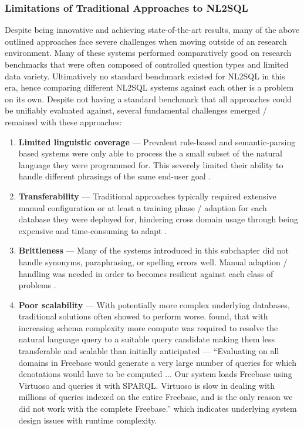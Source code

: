 \documentclass{article}
\begin{document}
\subsubsection{Limitations of Traditional Approaches to NL2SQL}

Despite being innovative and achieving state-of-the-art results, many of the above outlined approaches face severe 
challenges when moving outside of an research environment. Many of these systems performed comparatively good on research
benchmarks that were often composed of controlled question types and limited data variety. Ultimatively no standard
benchmark existed for NL2SQL in this era, hence comparing different NL2SQL systems against each other is a problem on 
its own. Despite not having a standard benchmark that all approaches could be unifiably evaluated against, several 
fundamental challenges emerged / remained with these approaches:

\begin{enumerate}
    \item \textbf{Limited linguistic coverage} — Prevalent rule-based and semantic-parsing based systems were only able to 
          process the a small subset of the natural language they were programmed for. This severely limited their 
          ability to handle different phrasings of the same end-user goal \citep{StringKernels, UnnaturalQueryLanguage, 
          Lunar, Ladder}.
    \item \textbf{Transferability} — Traditional approaches typically required extensive manual configuration or at least
          a training phase / adaption for each database they were deployed for, hindering cross domain usage through being 
          expensive and time-consuming to adapt \citep{NLIDBs, Lunar}.
    \item \textbf{Brittleness} — Many of the systems introduced in this subchapter did not handle synonyms, paraphrasing,   
          or spelling errors well. Manual adaption / handling was needed in order to becomes resilient against each class
          of problems \citep{StringKernels, SQLizer}.
    \item \textbf{Poor scalability} — With potentially more complex underlying databases, traditional 
          solutions often showed to perform worse. \citeauthor*{GraphMatching} found, that with increasing schema
          complexity more compute was required to resolve the natural language query to a suitable query candidate
          making them less transferable and scalable than initially anticipated \citep{GraphMatching} — ``Evaluating on
          all domains in Freebase would generate a very large number of queries for which denotations would have to be 
          computed ... Our system loads Freebase using Virtuoso and queries it with SPARQL. Virtuoso is slow in dealing with
          millions of queries indexed on the entire Freebase, and is the only reason we did not work with the complete
          Freebase.'' which indicates underlying system design issues with runtime complexity.
\end{enumerate}
\end{document}
